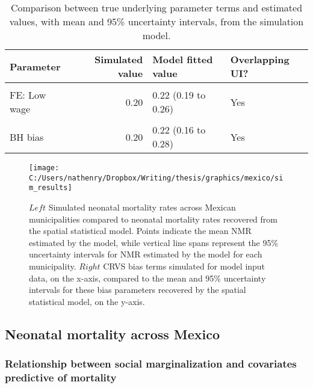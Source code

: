 \documentclass[
]{article}
\begin{document}
\begin{table}[!h]

\caption{\label{tab:sim-param-results}Comparison between true underlying parameter terms and estimated values, with mean and 95\% uncertainty intervals, from the simulation model.}
\centering
\begin{tabular}[t]{lrll}
\toprule
Parameter & Simulated value & Model fitted value & Overlapping UI?\\
\midrule
\cellcolor{gray!6}{FE: Years of school} & \cellcolor{gray!6}{-0.25} & \cellcolor{gray!6}{-0.24 (-0.28 to -0.21)} & \cellcolor{gray!6}{Yes}\\
FE: Low wage & 0.20 & 0.22 (0.19 to 0.26) & Yes\\
\cellcolor{gray!6}{FE: No health care} & \cellcolor{gray!6}{0.50} & \cellcolor{gray!6}{0.48 (0.46 to 0.51)} & \cellcolor{gray!6}{Yes}\\
BH bias & 0.20 & 0.22 (0.16 to 0.28) & Yes\\
\bottomrule
\end{tabular}
\end{table}

\begin{figure}[!ht]

{\centering \texttt{[image: C:/Users/nathenry/Dropbox/Writing/thesis/graphics/mexico/sim\_results]} 

}

\caption{\(Left\) Simulated neonatal mortality rates across Mexican municipalities  compared to neonatal mortality rates recovered from the spatial statistical model. Points indicate the mean NMR estimated by the model, while vertical line spans represent the 95\% uncertainty intervals for NMR estimated by the model for each municipality. \(Right\) CRVS bias terms simulated for model input data, on the x-axis, compared to the mean and 95\% uncertainty intervals for these bias parameters recovered by the spatial statistical model, on the y-axis.}\label{fig:sim-results}
\end{figure}

\hypertarget{neonatal-mortality-across-mexico}{%
\subsection{Neonatal mortality across Mexico}\label{neonatal-mortality-across-mexico}}

\hypertarget{relationship-between-social-marginalization-and-covariates-predictive-of-mortality}{%
\subsubsection{Relationship between social marginalization and covariates predictive of mortality}\label{relationship-between-social-marginalization-and-covariates-predictive-of-mortality}}
\end{document}

